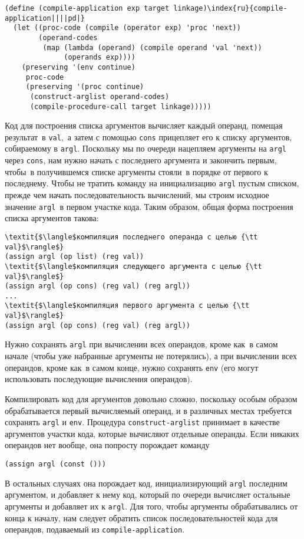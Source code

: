 \begin{Verbatim}[fontsize=\small]
(define (compile-application exp target linkage)\index{ru}{compile-application||||pd|}
  (let ((proc-code (compile (operator exp) 'proc 'next))
        (operand-codes
         (map (lambda (operand) (compile operand 'val 'next))
              (operands exp))))
    (preserving '(env continue)
     proc-code
     (preserving '(proc continue)
      (construct-arglist operand-codes)
      (compile-procedure-call target linkage)))))
\end{Verbatim}

Код для построения списка аргументов вычисляет каждый
операнд, помещая результат~в {\tt val},~а затем с помощью
{\tt cons} прицепляет его к списку аргументов, собираемому в
{\tt argl}.  Поскольку мы по очереди нацепляем аргументы на 
{\tt argl} через {\tt cons}, нам нужно начать с
последнего аргумента и закончить первым, чтобы~в получившемся списке
аргументы стояли~в порядке от первого к последнему.  Чтобы не тратить
команду на инициализацию {\tt argl} пустым списком, прежде чем
начать последовательность вычислений, мы строим исходное значение
{\tt argl}~в первом участке кода.  Таким образом, общая форма
построения списка аргументов такова:

\begin{Verbatim}[fontsize=\small]
\textit{$\langle$компиляция последнего операнда с целью {\tt val}$\rangle$}
(assign argl (op list) (reg val))
\textit{$\langle$компиляция следующего аргумента с целью {\tt val}$\rangle$}
(assign argl (op cons) (reg val) (reg argl))
...
\textit{$\langle$компиляция первого аргумента с целью {\tt val}$\rangle$}
(assign argl (op cons) (reg val) (reg argl))
\end{Verbatim}
Нужно сохранять {\tt argl} при вычислении всех операндов, кроме
как~в самом начале (чтобы уже набранные аргументы не потерялись), а
при вычислении всех операндов, кроме как~в самом конце, нужно
сохранять {\tt env} (его могут использовать последующие
вычисления операндов).

Компилировать код для аргументов довольно сложно, поскольку
особым образом обрабатывается первый вычисляемый операнд, и в
различных местах требуется сохранять {\tt argl} и
{\tt env}.  Процедура {\tt construct-arglist} принимает
в качестве аргументов участки кода, которые вычисляют отдельные
операнды.  Если никаких операндов нет вообще, она попросту порождает
команду

\begin{Verbatim}[fontsize=\small]
(assign argl (const ()))
\end{Verbatim}
В остальных случаях она порождает код, инициализирующий
{\tt argl} последним аргументом, и добавляет к нему код,
который по очереди вычисляет остальные аргументы и добавляет их к
{\tt argl}.  Для того, чтобы аргументы обрабатывались от конца
к началу, нам следует обратить список последовательностей кода для
операндов, подаваемый из {\tt compile-application}.

